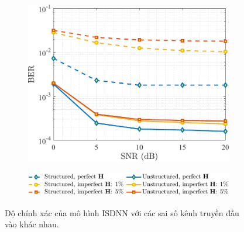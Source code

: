 \begin{figure}[ht]
    \centering
    \begin{subfigure}{\linewidth}
        \includegraphics[width=\linewidth]{figures/performance_2.pdf}
    \end{subfigure}
    \hfill
    \begin{subfigure}{\linewidth}
        \centering
        \includegraphics[width=.8\linewidth]{figures/lg_performance_2.pdf}
    \end{subfigure}
    \caption{Độ chính xác của mô hình ISDNN với các sai số kênh truyền đầu vào khác nhau.}
    \label{fig:isdnn_1}
\end{figure}

